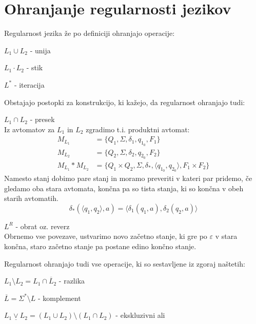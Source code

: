 \documentclass[10pt,a4paper,oneside]{book}
\begin{document}
\section{Ohranjanje regularnosti jezikov}
Regularnost jezika že po definiciji ohranjajo operacije:
\begin{items}
\item $L_1 \cup L_2$ - unija 
\item $L_1 \cdot L_2$ - stik 
\item $L^*$ - iteracija
\end{items}
Obstajajo postopki za konstrukcijo, ki kažejo, da regularnost ohranjajo tudi:
\begin{items}
\item $L_1 \cap L_2$ - presek\\
	Iz avtomatov za $L_1$ in $L_2$ zgradimo t.i. produktni avtomat:
		\begin{align*}
			M_{L_1} &= \{ Q_1, \Sigma, \delta_1, q_{1_0}, F_1 \}\\
			M_{L_2} &= \{ Q_2, \Sigma, \delta_2, q_{2_0}, F_2 \}\\
			M_{L_1}*M_{L_2} &= \{ Q_1 \times Q_2, \Sigma, \delta_*, \langle q_{1_0}, q_{2_0} \rangle, F_1 \times F_2 \}
		\end{align*}
	Namesto stanj dobimo pare stanj in moramo preveriti v kateri par pridemo, če gledamo oba stara avtomata, končna pa so tista stanja, ki so končna v obeh starih avtomatih.
	\[ \delta_*(\langle q_1, q_2 \rangle, a) = \langle \delta_1(q_1, a), \delta_2(q_2, a)\rangle \]
\item $L^R$ - obrat oz. reverz\\
	Obrnemo vse povezave, ustvarimo novo začetno stanje, ki gre po $\varepsilon$ v stara končna, staro začetno stanje pa postane edino končno stanje.
\end{items}
Regularnost ohranjajo tudi vse operacije, ki so sestavljene iz zgoraj naštetih:
\begin{items}
\item $L_1 \setminus L_2 = L_1 \cap \overline L_2$ - razlika
\item $\overline{L} = \Sigma^* \setminus L$ - komplement
\item $L_1 \underline\vee L_2 = (L_1 \cup L_2) \setminus (L_1 \cap L_2)$ - ekskluzivni ali 
\end{items}
\end{document}
